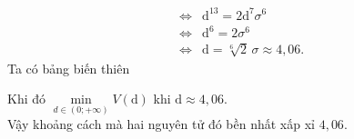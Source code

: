 \begin{bt}
{\begin{eqnarray*}
			 &\Leftrightarrow& \mathrm{d}^{13}=2\mathrm{d}^7\sigma^6 \\
			&\Leftrightarrow& \mathrm{d}^6=2\sigma^6 \\ 
			&\Leftrightarrow& \mathrm{d}=\sqrt[6]{2}\,\sigma  \approx 4{,}06.
		\end{eqnarray*}
		Ta có bảng  biến thiên
		\begin{center}
		\end{center}
		Khi đó $\min\limits_{d\in(0;+\infty)}  V(\mathrm{d})$ khi $\mathrm{d}\approx 4{,}06$.\\
		Vậy khoảng  cách mà hai nguyên tử đó bền nhất xấp xỉ $4{,}06$.
	 }
\end{bt}


